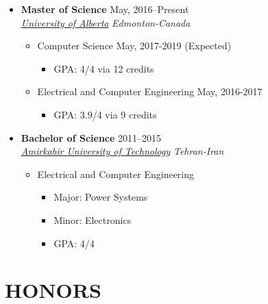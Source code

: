 \begin{itemize}
	\item \textbf{Master of Science} \hfill May, 2016--Present \\ 
	\href{https://ualberta.ca/}{ \emph{University of Alberta}} \hfill \emph{Edmonton-Canada}
	\begin{itemize}
		\item Computer Science \hspace{10 pt}  \hspace{10 pt}  \hfill  May, 2017-2019 (Expected)
		\begin{itemize}
			\item GPA: 4/4 via 12 credits \\
		\end{itemize}
		\item Electrical and Computer Engineering \hspace{10 pt}  \hspace{10 pt}  \hfill  May, 2016-2017 
		\begin{itemize}
			\item GPA: 3.9/4 via 9 credits \\
		\end{itemize}
	\end{itemize}
	
	
	\item \textbf{Bachelor of Science} \hfill 2011--2015 \\
	\href{http://aut.ac.ir/aut/}{ \emph{Amirkabir University of Technology}} \hfill \emph{Tehran-Iran}

	\begin{itemize}
		\item Electrical and Computer Engineering
		\begin{itemize}		
		\item Major: Power Systems \hspace{10 pt} 
		\item Minor: Electronics \hspace{36 pt}   
		\item GPA: 4/4
		\end{itemize}
	\end{itemize}

\end{itemize}
\section{HONORS}

